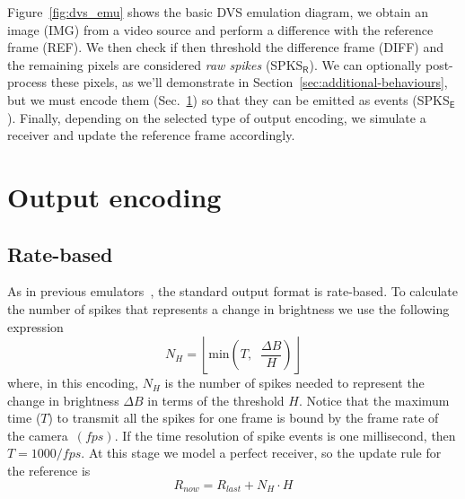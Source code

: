 \documentclass[conference]{IEEEtran}
\begin{document}
Figure~\ref{fig:dvs_emu} shows the basic DVS emulation diagram, we obtain an image (\textsf{IMG}) from a video source and perform a difference with the reference frame (\textsf{REF}). We then check if then threshold the difference frame (\textsf{DIFF}) and the remaining pixels are considered \textit{raw spikes} (\textsf{SPKS}$\mathsf{_R}$). We can optionally post-process these pixels, as we'll demonstrate in Section~\ref{sec:additional-behaviours}, but we must encode them (Sec.~\ref{sec:output-modes}) so that they can be emitted as events (\textsf{SPKS}$\mathsf{_E}$). Finally, depending on the selected type of output encoding, we simulate a receiver and update the reference frame accordingly. 


\section{Output encoding}
\label{sec:output-modes}
\subsection{Rate-based}
As in previous emulators~\cite{DVSemu}, the standard output format is rate-based. To calculate the number of spikes that represents a change in brightness we use the following expression
\begin{equation}
  \label{eq:num_spikes_rate}
  N_{H} = \left\lfloor \mathrm{min}\left( T, \;\; \frac{\Delta B}{H} \right) \right\rfloor
\end{equation}
where, in this encoding, $N_{H}$ is the number of spikes needed to represent the change in brightness $\Delta B$ in terms of the threshold $H$. Notice that the maximum time ($T$) to transmit all the spikes for one frame is bound by the frame rate of the camera~$(fps)$. If the time resolution of spike events is one millisecond, then $T = 1000/fps$. At this stage we model a perfect receiver, so the update rule for the reference is
\begin{equation}
  \label{eq:ref_update}
  R_{now} = R_{last} + N_{H}\cdot H
\end{equation}

\end{document}

